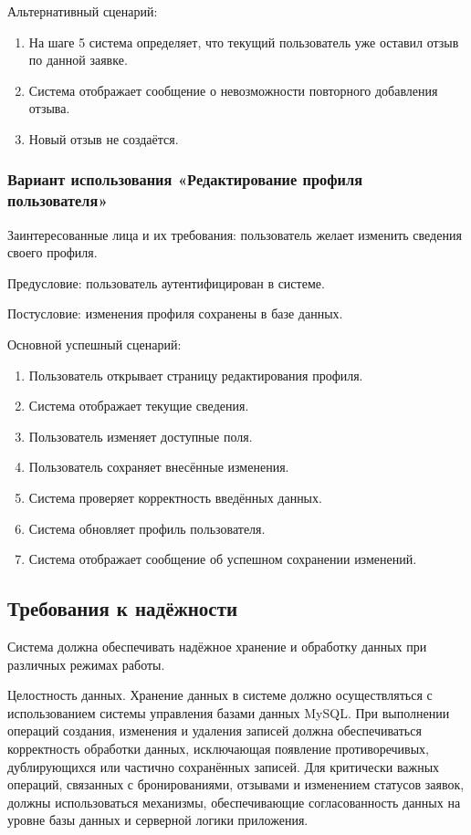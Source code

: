 Альтернативный сценарий:
\begin{enumerate}
	\item На шаге 5 система определяет, что текущий пользователь уже оставил отзыв по данной заявке.
	\item Система отображает сообщение о невозможности повторного добавления отзыва.
	\item Новый отзыв не создаётся.
\end{enumerate}

\subsubsection{Вариант использования «Редактирование профиля пользователя»}

Заинтересованные лица и их требования: пользователь желает изменить сведения своего профиля.

Предусловие: пользователь аутентифицирован в системе.

Постусловие: изменения профиля сохранены в базе данных.

Основной успешный сценарий:
\begin{enumerate}
	\item Пользователь открывает страницу редактирования профиля.
	\item Система отображает текущие сведения.
	\item Пользователь изменяет доступные поля.
	\item Пользователь сохраняет внесённые изменения.
	\item Система проверяет корректность введённых данных.
	\item Система обновляет профиль пользователя.
	\item Система отображает сообщение об успешном сохранении изменений.
\end{enumerate}

\subsection{Требования к надёжности}

Система должна обеспечивать надёжное хранение и обработку данных при различных режимах работы.

Целостность данных.  
Хранение данных в системе должно осуществляться с использованием системы управления базами данных MySQL. При выполнении операций создания, изменения и удаления записей должна обеспечиваться корректность обработки данных, исключающая появление противоречивых, дублирующихся или частично сохранённых записей. Для критически важных операций, связанных с бронированиями, отзывами и изменением статусов заявок, должны использоваться механизмы, обеспечивающие согласованность данных на уровне базы данных и серверной логики приложения.

